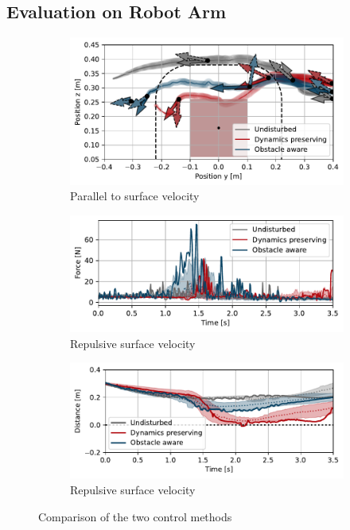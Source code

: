 \subsection{Evaluation on Robot Arm}

\begin{figure}
    \centering
    \begin{subfigure}{\columnwidth}
      \centerline{\includegraphics[width=\textwidth]{figures/robot_arm_trajectory_xyz}}
      \caption{Parallel to surface velocity}
      \label{fig:robot_arm_trajectory_xyz}
    \end{subfigure}
    \begin{subfigure}{\columnwidth}
    \includegraphics[width=\textwidth]{figures/trajectory_comparison_force_magnitude}
      \caption{Repulsive surface velocity}
      \label{fig:trajectory_comparison_force_magnitude}
    \end{subfigure}
    \begin{subfigure}{\columnwidth}
       \includegraphics[width=\textwidth]{figures/robot_arm_trajectory_distance}
      \caption{Repulsive surface velocity}
      \label{fig:disturbance_with_repulsive_velocity}
    \end{subfigure}
    \caption{Comparison of the two control methods}
    \label{fig:evaluation_on_robot_arm}
\end{figure}

